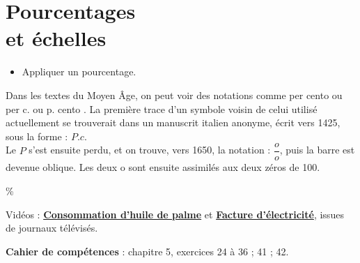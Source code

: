 \themaN
\graphicspath{{../Ch27_Pourcentages_echelles_vitesse/Images/}}

\chapter{Pourcentages\\et échelles}
\label{C17}

\begin{prerequis}
   \begin{itemize}
     \item Appliquer un pourcentage.
   \end{itemize}
\end{prerequis}

\vfill

\begin{debat} 
   Dans les textes du Moyen Âge, on peut voir des notations comme \og per cento \fg{} ou \og per c. \fg{} ou \og p. cento \fg. La première trace d'un symbole voisin de celui utilisé actuellement se trouverait dans un manuscrit italien anonyme, écrit vers 1425, sous la forme : $P.c$\degre. \\
   Le \og $P$ \fg{} s'est ensuite perdu, et on trouve, vers 1650, la notation : $\dfrac{o}{o}$, puis la barre est devenue oblique. Les deux \og o \fg{} sont ensuite assimilés aux deux zéros de 100. \\
   \begin{center}
      \textcolor{B1}{\fontsize{70}{80}\selectfont \%}
   \end{center}
   \bigskip
   \begin{cadre}[B2][F4]
      \begin{center}
         Vidéos : \href{https://www.youtube.com/watch?v=ibWzdm_05zs}{\bf Consommation d'huile de palme} et \href{https://www.youtube.com/watch?v=gLbsxj8mv-U}{\bf Facture d'électricité}, issues de journaux télévisés.
      \end{center}
   \end{cadre}
\end{debat}

\vfill

\textcolor{PartieGeometrie}{\sffamily\bfseries Cahier de compétences} : chapitre 5, exercices 24 à 36 ; 41 ; 42.


\activites

